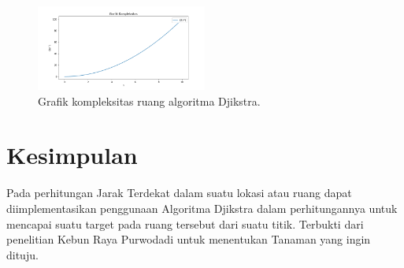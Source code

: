 \documentclass[conference]{IEEEtran}
\begin{document}
    \begin{figure}[H]
        \centerline{\includegraphics[width=0.5\textwidth]{./sources/onn.png}}
        \caption{Grafik kompleksitas ruang algoritma Djikstra.}
        \label{fig9}
    \end{figure}

\section{Kesimpulan}

    Pada perhitungan Jarak Terdekat dalam suatu lokasi atau ruang dapat diimplementasikan penggunaan Algoritma Djikstra
    dalam perhitungannya untuk mencapai suatu target pada ruang tersebut dari suatu titik. Terbukti dari penelitian Kebun Raya
    Purwodadi untuk menentukan Tanaman yang ingin dituju.




\end{document}
